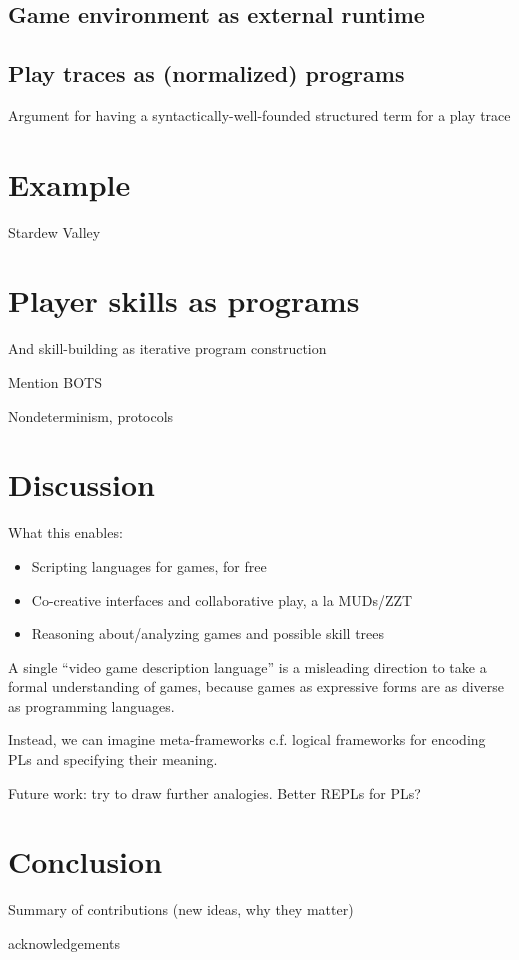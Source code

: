 \documentclass[sigconf]{acmart}
\begin{document}
  \subsection{Game environment as external runtime}

  \subsection{Play traces as (normalized) programs}
  
  Argument for having a syntactically-well-founded structured term for a
  play trace

  
\section{Example}

Stardew Valley

\section{Player skills as programs}

And skill-building as iterative program construction

Mention BOTS

Nondeterminism, protocols

\section{Discussion}

  What this enables:
  \begin{itemize}
  \item Scripting languages for games, for free
  \item Co-creative interfaces and collaborative play, a la MUDs/ZZT
  \item Reasoning about/analyzing games and possible skill trees
  \end{itemize}

  A single ``video game description language'' is a misleading direction to
  take a formal understanding of games, because games as expressive forms
  are as diverse as programming languages.

  Instead, we can imagine meta-frameworks c.f. logical frameworks for
  encoding PLs and specifying their meaning.

  Future work: try to draw further analogies. Better REPLs for PLs? 

\section{Conclusion}

  Summary of contributions (new ideas, why they matter)

\begin{acks}
  acknowledgements
\end{acks}

% 
%  
\end{document}
